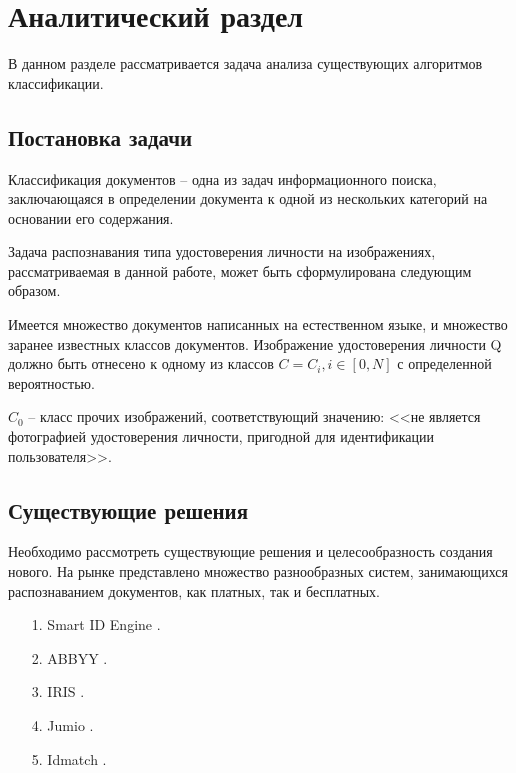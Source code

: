 \chapter{\textbf{Аналитический раздел}}

В данном разделе рассматривается задача анализа существующих алгоритмов классификации.

\section{Постановка задачи}

Классификация документов -- одна из задач информационного поиска, заключающаяся в определении документа к одной из нескольких категорий на основании его содержания. 

Задача распознавания типа удостоверения личности на изображениях, рассматриваемая в данной работе, может быть сформулирована следующим образом. 

Имеется множество документов написанных на естественном языке, и множество заранее известных классов документов. Изображение удостоверения личности Q должно быть отнесено к одному из классов $C=C_i, i \in [0, N]$ с определенной вероятностью.

$C_0$ -- класс прочих изображений, соответствующий значению: <<не является фотографией удостоверения личности, пригодной для идентификации пользователя>>.

\section{Существующие решения}

Необходимо рассмотреть существующие решения и целесообразность создания нового. На рынке представлено множество разнообразных систем, занимающихся распознаванием документов, как платных, так и бесплатных.

\begin{enumerate}
\item[1.] Smart ID Engine \cite{smartengine}.

\item[2.] ABBYY \cite{abbyy}.

\item[3.] IRIS \cite{iris}.

\item[4.] Jumio \cite{jumio}.

\item[5.] Idmatch \cite{idmatch}.
\end{enumerate}

